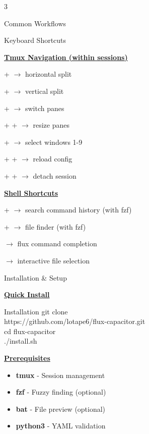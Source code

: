 \documentclass[10pt,a4paper]{article}
\begin{document}
\begin{multicols}{3}
\begin{textbox}{Common Workflows}
\end{textbox}

\begin{textbox}{Keyboard Shortcuts}

\underline{\textbf{Tmux Navigation (within sessions)}}

 +  $\rightarrow$ horizontal split

 +  $\rightarrow$ vertical split

 +  $\rightarrow$ switch panes

 +  +  $\rightarrow$ resize panes

 +  $\rightarrow$ select windows 1-9

 +  +  $\rightarrow$ reload config

 +  +  $\rightarrow$ detach session

\underline{\textbf{Shell Shortcuts}}

 +  $\rightarrow$ search command history (with fzf)

 +  $\rightarrow$ file finder (with fzf)

 $\rightarrow$ flux command completion

  $\rightarrow$ interactive file selection

\end{textbox}

\begin{textbox}{Installation \& Setup}

\underline{\textbf{Quick Install}}

\begin{simplecodebox}{Installation}
git clone \\
\phantom{xx}https://github.com/lotape6/flux-capacitor.git\\
cd flux-capacitor\\
./install.sh\\
\end{simplecodebox}

\underline{\textbf{Prerequisites}}
\begin{itemize}
    \item \textbf{tmux} - Session management
    \item \textbf{fzf} - Fuzzy finding (optional)
    \item \textbf{bat} - File preview (optional)  
    \item \textbf{python3} - YAML validation
\end{itemize}


\end{textbox}
\end{multicols}
\end{document}
